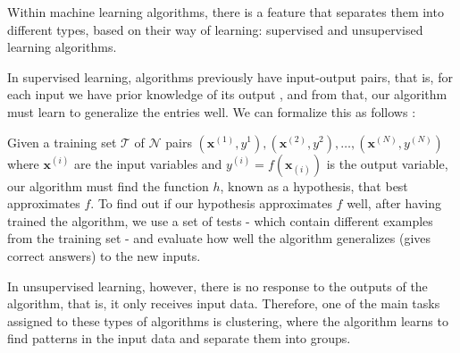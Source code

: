 Within machine learning algorithms, there is a feature that separates them into different types, based on their way of learning: supervised and unsupervised learning algorithms.

In supervised learning, algorithms previously have input-output pairs, that is, for each input we have prior knowledge of its output \cite{russell2016}, and from that, our algorithm must learn to generalize the entries well. We can formalize this as follows \cite{russell2016}:

Given a training set $\mathcal{T}$ of $\mathcal{N}$ pairs $(\mathbf{x}^{(1)},y^1),(\mathbf{x}^{(2)},y^2),\dots,(\mathbf{x}^{(N)},y^{(N)})$ where $\mathbf{x}^{(i)}$ are the input variables and $y^{(i)}=f(\mathbf{x}_{(i)})$ is the output variable, our algorithm must find the function $h$, known as a hypothesis, that best approximates $f$. To find out if our hypothesis approximates $f$ well, after having trained the algorithm, we use a set of tests - which contain different examples from the training set - and evaluate how well the algorithm generalizes (gives correct answers) to the new inputs.

In unsupervised learning, however, there is no response to the outputs of the algorithm, that is, it only receives input data. Therefore, one of the main tasks assigned to these types of algorithms is clustering, where the algorithm learns to find patterns in the input data and separate them into groups.






